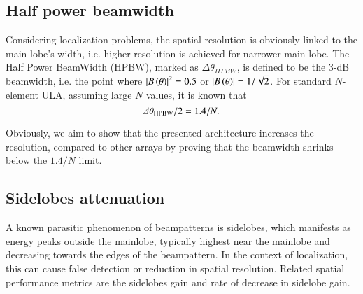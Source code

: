 \subsection{Half power beamwidth}
Considering localization problems, the spatial resolution is obviously linked to the main lobe's width, i.e. higher resolution is achieved for narrower main lobe.
The Half Power BeamWidth (HPBW), marked as $\Delta\theta_{HPBW}$, is defined to be the 3-dB beamwidth, i.e. the point where $\left\vert B\left({\theta}\right)\right\vert^{2} = 0.5$ or $\left\vert B\left({\theta}\right)\right\vert = 1/\sqrt{2}$.
For standard $N$-element ULA, assuming large $N$ values, it is known \cite{van2004optimum} that
\begin{equation}
    \label{eq_known_HBPW}
    \Delta\theta_{\text{HPBW}}/2= 1.4/N.
\end{equation}
\par
Obviously, we aim to show that the presented architecture increases the resolution, compared to other arrays by proving that the beamwidth shrinks below the $1.4/N$ limit.
%
%
%
\subsection{Sidelobes attenuation}
A known \cite{van2004optimum} parasitic phenomenon of beampatterns is sidelobes, which manifests as energy peaks outside the mainlobe, typically highest near the mainlobe and decreasing towards the edges of the beampattern.
In the context of localization, this can cause false detection or reduction in spatial resolution.
Related spatial performance metrics are the sidelobes gain and rate of decrease in sidelobe gain.
%
%
%
